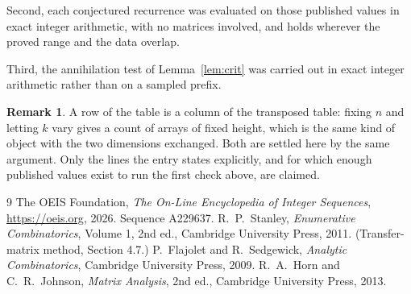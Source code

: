 \documentclass[11pt,a4paper]{article}
\theoremstyle{plain}
\theoremstyle{definition}
\newtheorem{remark}[theorem]{Remark}
\begin{document}
Second, each conjectured recurrence was evaluated on those published values in exact
integer arithmetic, with no matrices involved, and holds wherever the proved range and the
data overlap.

Third, the annihilation test of Lemma~\ref{lem:crit} was carried out in exact integer
arithmetic rather than on a sampled prefix.

\begin{remark}
A row of the table is a column of the transposed table: fixing $n$ and letting $k$ vary gives a
count of arrays of fixed height, which is the same kind of object with the two dimensions
exchanged. Both are settled here by the same argument. Only the lines the entry states
explicitly, and for which enough published values exist to run the first check above, are
claimed.
\end{remark}

\begin{thebibliography}{9}
 The OEIS Foundation, \emph{The On-Line Encyclopedia of Integer
Sequences}, \url{https://oeis.org}, 2026. Sequence A229637.
 R.~P.~Stanley, \emph{Enumerative Combinatorics}, Volume 1, 2nd ed.,
Cambridge University Press, 2011. (Transfer-matrix method, Section 4.7.)
 P.~Flajolet and R.~Sedgewick, \emph{Analytic Combinatorics}, Cambridge
University Press, 2009.
 R.~A.~Horn and C.~R.~Johnson, \emph{Matrix Analysis}, 2nd ed., Cambridge
University Press, 2013.
\end{thebibliography}
\end{document}
